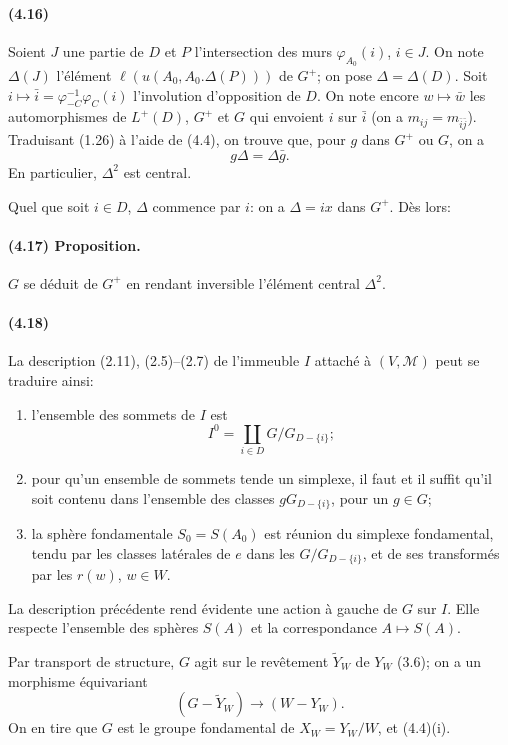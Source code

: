 \documentclass[10pt,a4paper]{article}
\begin{document}
\paragraph{(4.16)} Soient \(J\) une partie de \(D\) et \(P\) l'intersection des murs \(\varphi_{A_0}(i)\), \(i\in J\). On note \(\Delta(J)\) l'élément \(\ell(u(A_0,A_0.\Delta(P)))\) de \(G^+\); on pose \(\Delta=\Delta(D)\). Soit \(i\mapsto\bar i=\varphi_{-C}^{-1}\varphi_C(i)\) l'involution d'opposition de \(D\). On note encore \(w\mapsto\bar w\) les automorphismes de \(L^+(D)\), \(G^+\) et \(G\) qui envoient \(i\) sur \(\bar i\) (on a \(m_{ij}=m_{\bar i\bar j}\)). Traduisant (1.26) à l'aide de (4.4), on trouve que, pour \(g\) dans \(G^+\) ou \(G\), on a
\[
\tag{4.16.1}
g\Delta=\Delta\bar g.
\]
En particulier, \(\Delta^2\) est central.

Quel que soit \(i\in D\), \(\Delta\) commence par \(i\): on a \(\Delta=ix\) dans \(G^+\). Dès lors:

\paragraph{(4.17) Proposition.} \(G\) se déduit de \(G^+\) en rendant inversible l'élément central \(\Delta^2\).

\paragraph{(4.18)} La description (2.11), (2.5)--(2.7) de l'immeuble \(I\) attaché à \((V,\mathcal M)\) peut se traduire ainsi:
\begin{enumerate}[label=\alph*)]
\item l'ensemble des sommets de \(I\) est
\[
I^0=\coprod_{i\in D}G/G_{D-\{i\}};
\]
\item pour qu'un ensemble de sommets tende un simplexe, il faut et il suffit qu'il soit contenu dans l'ensemble des classes \(gG_{D-\{i\}}\), pour un \(g\in G\);
\item la sphère fondamentale \(S_0=S(A_0)\) est réunion du simplexe fondamental, tendu par les classes latérales de \(e\) dans les \(G/G_{D-\{i\}}\), et de ses transformés par les \(r(w)\), \(w\in W\).
\end{enumerate}
La description précédente rend évidente une action à gauche de \(G\) sur \(I\). Elle respecte l'ensemble des sphères \(S(A)\) et la correspondance \(A\mapsto S(A)\).

Par transport de structure, \(G\) agit sur le revêtement \(\widetilde Y_W\) de \(Y_W\) (3.6); on a un morphisme équivariant
\[
(G-\widetilde Y_W)\longrightarrow (W-Y_W).
\]
On en tire que \(G\) est le groupe fondamental de \(X_W=Y_W/W\), et (4.4)(i).
\end{document}

